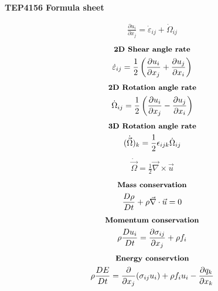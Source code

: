 \documentclass[10pt, a4paper]{article}
\begin{document}
\begin{center}
    \Large
    \textbf{TEP4156 Formula sheet}
    \vspace{0.5cm}
\end{center}

\begin{multicols*}{2}
    \begin{gather*}
        \frac{\partial u_i}{\partial x_j} = \dot{\varepsilon}_{ij} + \dot{\Omega}_{ij}
    \end{gather*}
    \begin{gather*}
        \textbf{\small 2D Shear angle rate} \\
        \dot{\varepsilon}_{ij} = \frac12\left( \frac{\partial u_i}{\partial x_j} +
        \frac{\partial u_j}{\partial x_i}\right)
    \end{gather*}
    \begin{gather*}
        \textbf{\small 2D Rotation angle rate} \\
        \dot{\Omega}_{ij} = \frac12\left( \frac{\partial u_i}{\partial x_j} -
        \frac{\partial u_j}{\partial x_i}\right)
    \end{gather*}
    \begin{gather*}
        \textbf{\small 3D Rotation angle rate} \\
        (\dot{\vec{\Omega}})_k = \frac12 \epsilon_{ijk}\dot{\Omega}_{ij}
    \end{gather*}
    \begin{gather*}
        \dot{\vec{\Omega}} = \frac12 \vec{\nabla}\times\vec{u}
    \end{gather*}
    \begin{gather*}
        \textbf{\small Mass conservation} \\
        \frac{D\rho}{Dt} + \rho \vec{\nabla} \cdot \vec{u} = 0
    \end{gather*}
    \begin{gather*}
        \textbf{\small Momentum conservation} \\
        \rho \frac{Du_i}{Dt} = \frac{\partial \sigma_{ij}}{\partial x_j} + \rho f_i
    \end{gather*}
    \begin{gather*}
        \textbf{\small Energy conservtion} \\
        \rho \frac{DE}{Dt} = \frac{\partial}{\partial x_j}(\sigma_{ij} u_i) + \rho f_i u_i - \frac{\partial q_k}{\partial x_k}
    \end{gather*}
    \begin{gather*}

\end{gather*}
\end{multicols*}
\end{document}
